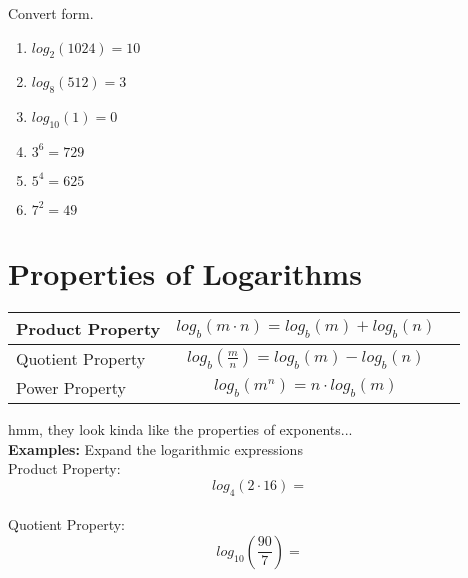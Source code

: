 \documentclass[12pt]{article}
\begin{document}
Convert form.

\begin{enumerate}

	\item $log_2(1024)=10$\\
	
	\item $log_8(512)=3$\\
	
	\item $log_{10}(1)=0$\\
	
	\item $3^6=729$\\
	
	\item $5^4=625$\\
	
	\item $7^2=49$\\

\end{enumerate}



\section{Properties of Logarithms}

\begin{center}
\def\arraystretch{2}
\begin{tabular}{| l | c | c |}

\hline
	Product Property  & $log_{b}(m \cdot n)= log_{b}(m) + log_{b}(n)$  \\ \hline
	Quotient Property & $log_{b}\left(\frac{m}{n} \right) = log_{b}(m)-log_{b}(n)$\\ \hline
	Power Property & $log_{b}\left( m^{n} \right) = n \cdot log_{b}(m)$\\ \hline

\end{tabular}
\end{center}

hmm, they look kinda like the properties of exponents...\\

\textbf{Examples:} Expand the logarithmic expressions\\

Product Property: $$log_{4}(2 \cdot 16)= $$\\

Quotient Property: $$log_{10}\left(\frac{90}{7} \right)=$$\\
\end{document}
